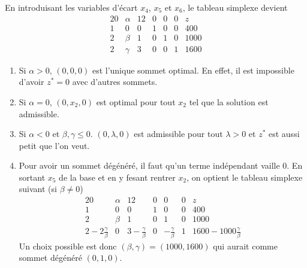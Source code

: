 \begin{enumerate}
    \begin{solution}
      En introduisant les variables d'écart $x_4$, $x_5$ et $x_6$,
      le tableau simplexe devient
      \[
        \begin{array}{cccccc|l}
          20 & \alpha & 12 & 0 & 0 & 0 & z\\
          \hline
           1 & 0      &  0 & 1 & 0 & 0 & 400\\
           2 & \beta  &  1 & 0 & 1 & 0 & 1000\\
           2 & \gamma &  3 & 0 & 0 & 1 & 1600
        \end{array}
      \]
      \begin{enumerate}
        \item Si $\alpha > 0$, $(0,0,0)$ est l'unique sommet optimal.
          En effet, il est impossible d'avoir $z^* = 0$ avec d'autres sommets.
        \item Si $\alpha = 0$, $(0,x_2,0)$ est optimal pour tout $x_2$
          tel que la solution est admissible.
        \item Si $\alpha < 0$ et $\beta,\gamma \leq 0$.
          $(0,\lambda,0)$ est admissible pour tout $\lambda > 0$ et
          $z^*$ est aussi petit que l'on veut.
        \item Pour avoir un sommet dégénéré, il faut qu'un terme indépendant
          vaille 0.
          En sortant $x_5$ de la base et en y fesant rentrer $x_2$, on
          optient le tableau simplexe suivant (si $\beta \neq 0$)
          \[
            \begin{array}{cccccc|l}
              20 & \alpha & 12 & 0 & 0 & 0 & z\\
              \hline
              1 & 0      &  0 & 1 & 0 & 0 & 400\\
              2 & \beta  &  1 & 0 & 1 & 0 & 1000\\
              2-2\frac{\gamma}{\beta} & 0
              & 3-\frac{\gamma}{\beta} & 0 & -\frac{\gamma}{\beta} & 1
              & 1600 - 1000\frac{\gamma}{\beta}
            \end{array}
          \]
          Un choix possible est donc $(\beta,\gamma) = (1000,1600)$
          qui aurait comme sommet dégénéré $(0,1,0)$.
      \end{enumerate}
    \end{solution}


\end{enumerate}
